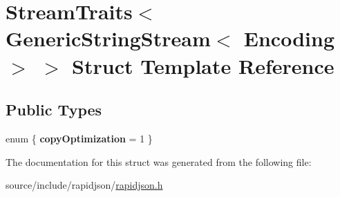\hypertarget{struct_stream_traits_3_01_generic_string_stream_3_01_encoding_01_4_01_4}{}\section{Stream\+Traits$<$ Generic\+String\+Stream$<$ Encoding $>$ $>$ Struct Template Reference}
\label{struct_stream_traits_3_01_generic_string_stream_3_01_encoding_01_4_01_4}
\subsection*{Public Types}
\begin{DoxyCompactItemize}
\item 
\hypertarget{struct_stream_traits_3_01_generic_string_stream_3_01_encoding_01_4_01_4_a36081c50934bef71843a4d351a98612e}{}enum \{ {\bfseries copy\+Optimization} = 1
 \}\label{struct_stream_traits_3_01_generic_string_stream_3_01_encoding_01_4_01_4_a36081c50934bef71843a4d351a98612e}

\end{DoxyCompactItemize}


The documentation for this struct was generated from the following file\+:\begin{DoxyCompactItemize}
\item 
source/include/rapidjson/\hyperlink{rapidjson_8h}{rapidjson.\+h}\end{DoxyCompactItemize}
